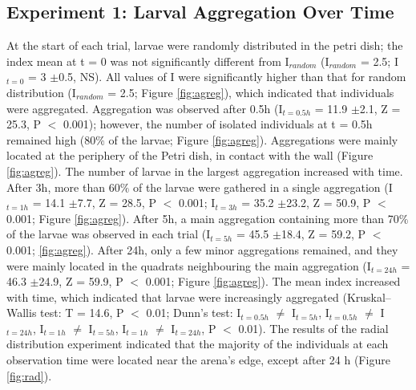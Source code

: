 \subsection{Experiment 1: Larval Aggregation Over Time}
At the start of each trial, larvae were randomly distributed in the petri dish; the index mean at t = 0 was not significantly different from I$_{random}$ (I$_{random}$ = 2.5; I$_{t=0}$ = 3 $\pm$0.5, NS). All values of I were significantly higher than that for random distribution (I$_{random}$ = 2.5; Figure \ref{fig:agreg}), which indicated that individuals were aggregated. Aggregation was observed after 0.5h (I$_{t=0.5h}$ = 11.9 $\pm$2.1, Z = 25.3, P $<$ 0.001); however, the number of isolated individuals at t = 0.5h remained high (80$\%$ of the larvae; Figure \ref{fig:agreg}). Aggregations were mainly located at the periphery of the Petri dish, in contact with the wall (Figure \ref{fig:agreg}). The number of larvae in the largest aggregation increased with time. After 3h, more than 60$\%$ of the larvae were gathered in a single aggregation (I$_{t=1h}$ = 14.1 $\pm$7.7, Z = 28.5, P $<$ 0.001; I$_{t=3h}$ = 35.2 $\pm$23.2, Z = 50.9, P $<$ 0.001; Figure \ref{fig:agreg}). After 5h, a main aggregation containing more than 70$\%$ of the larvae was observed in each trial (I$_{t=5h}$ = 45.5 $\pm$18.4, Z = 59.2, P $<$ 0.001; \ref{fig:agreg}). After 24h, only a few minor aggregations remained, and they were mainly located in the quadrats neighbouring the main aggregation (I$_{t=24h}$ = 46.3 $\pm$24.9, Z = 59.9, P $<$ 0.001; Figure \ref{fig:agreg}). The mean index increased with time, which indicated that larvae were increasingly aggregated (Kruskal–Wallis test: T = 14.6, P $<$ 0.01; Dunn's test: I$_{t=0.5h}$ $\neq$ I$_{t=5h}$, I$_{t=0.5h}$ $\neq$ I$_{t=24h}$, I$_{t=1h}$ $\neq$ I$_{t=5h}$, I$_{t=1h}$ $\neq$ I$_{t=24h}$, P $<$ 0.01). The results of the radial distribution experiment indicated that the majority of the individuals at each observation time were located near the arena's edge, except after 24 h (Figure \ref{fig:rad}).

